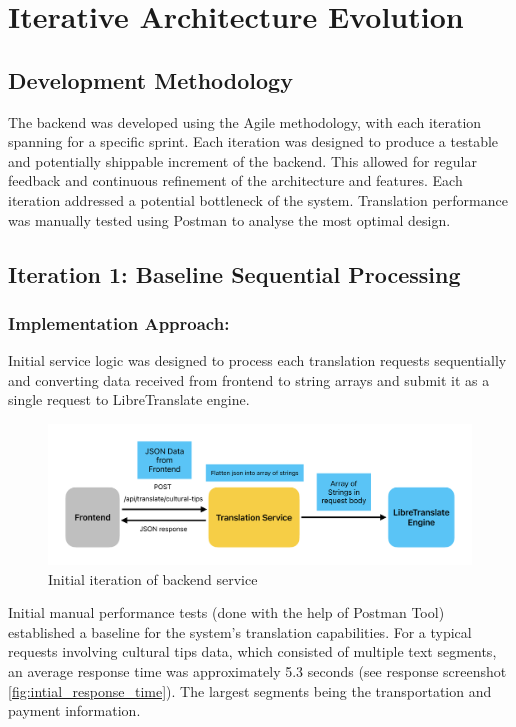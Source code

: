 \section{Iterative Architecture Evolution}

\subsection{Development Methodology}

The backend was developed using the Agile methodology, with each iteration spanning for a specific sprint. Each iteration was designed to produce a testable and potentially shippable increment of the backend. This allowed for regular feedback and continuous refinement of the architecture and features. Each iteration addressed a potential bottleneck of the system. Translation performance was manually tested using Postman\cite{postman2025} to analyse the most optimal design.

\subsection{Iteration 1: Baseline Sequential Processing}

\subsubsection{Implementation Approach:} Initial service logic was designed to process each translation requests sequentially and converting data received from frontend to string arrays and submit it as a single request to LibreTranslate engine.

\begin{figure}[H]
    \centering
    \includegraphics[width=1\linewidth]{images/Backend_Documents/Backend_Initial_Concept.pdf}
    \caption{Initial iteration of backend service}
    \label{fig:backend_iteration_1}
\end{figure}

Initial manual performance tests (done with the help of Postman Tool\cite{postman2025}) established a baseline for the system's translation capabilities. For a typical requests involving cultural tips data, which consisted of multiple text segments, an average response time was approximately 5.3 seconds (see response screenshot \ref{fig:intial_response_time}). The largest segments being the transportation and payment information.

